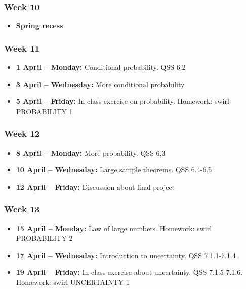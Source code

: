 \documentclass[a4paper,12pt]{article}
\begin{document}
\subsubsection*{Week 10}

\begin{itemize}
	\item \textbf{Spring recess} 
\end{itemize}


\subsubsection*{Week 11}

\begin{itemize}
	\item \textbf{1 April -- Monday:} Conditional probability. QSS 6.2
	\item \textbf{3 April -- Wednesday:} More conditional probability 
	\item \textbf{5 April -- Friday:} In class exercise on probability. Homework: swirl PROBABILITY 1
\end{itemize}

\subsubsection*{Week 12}

\begin{itemize}
	\item \textbf{8 April -- Monday:} More probability. QSS 6.3
	\item \textbf{10 April -- Wednesday:} Large sample theorems. QSS 6.4-6.5
	\item \textbf{12 April -- Friday:} Discussion about final project 
\end{itemize}

\subsubsection*{Week 13}

\begin{itemize}
	\item \textbf{15 April -- Monday:} Law of large numbers. Homework: swirl PROBABILITY 2
	\item \textbf{17 April -- Wednesday:} Introduction to uncertainty. QSS 7.1.1-7.1.4
	\item \textbf{19 April -- Friday:} In class exercise about uncertainty. QSS 7.1.5-7.1.6. Homework: swirl UNCERTAINTY 1 
\end{itemize}
\end{document}
